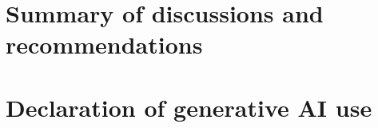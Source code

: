 \documentclass{indc-report}
\begin{document}
\newpage
\section{Summary of discussions and recommendations}

\newpage

\section*{Declaration of generative AI use}

\newpage

{}


\newpage


\end{document}
